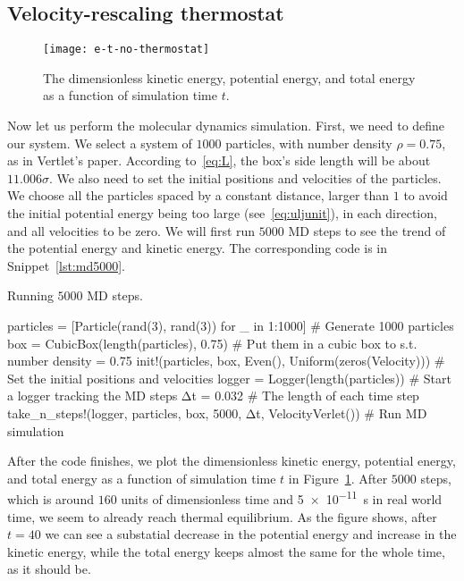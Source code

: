 \subsection{Velocity-rescaling thermostat}

\begin{figure}[H]
    \centering
    \texttt{[image: e-t-no-thermostat]}
    \caption{The dimensionless kinetic energy, potential energy, and total energy
        as a function of simulation time \(t\).}
    \label{fig:md5000}
\end{figure}

Now let us perform the molecular dynamics simulation.
First, we need to define our system. We select a system of \(1000\) particles,
with number density \(\rho = 0.75\), as in Vertlet\cite{Verlet}'s paper.
According to~\eqref{eq:L}, the box's side length will be about \(11.006 \sigma\).
We also need to set the initial positions and velocities of the particles.
We choose all the particles spaced by a constant distance, larger than \(1\)
to avoid the initial potential energy being too large (see~\eqref{eq:uljunit}),
in each direction, and all velocities to be zero.
We will first run \(5000\) MD steps to see the trend of the potential energy
and kinetic energy.
The corresponding code is in Snippet~\ref{lst:md5000}.

\begin{algorithm}[H]
    \caption{Running \(5000\) MD steps.}
    \label{lst:md5000}
    \begin{juliacode}
        particles = [Particle(rand(3), rand(3)) for _ in 1:1000]  # Generate 1000 particles
        box = CubicBox(length(particles), 0.75)  # Put them in a cubic box to s.t. number density = 0.75
        init!(particles, box, Even(), Uniform(zeros(Velocity)))  # Set the initial positions and velocities
        logger = Logger(length(particles))  # Start a logger tracking the MD steps
        Δt = 0.032  # The length of each time step
        take_n_steps!(logger, particles, box, 5000, Δt, VelocityVerlet())  # Run MD simulation
    \end{juliacode}
\end{algorithm}

After the code finishes, we plot the dimensionless kinetic energy, potential energy,
and total energy as a function of simulation time \(t\) in Figure~\ref{fig:md5000}.
After \(5000\) steps, which is around \(160\) units of dimensionless time and
\qty{5e-11}{\second} in real world time, we seem to already reach thermal equilibrium.
As the figure shows, after \(t = 40\) we can see a substatial decrease in the potential energy
and increase in the kinetic energy, while the total energy keeps almost the same for
the whole time, as it should be.

